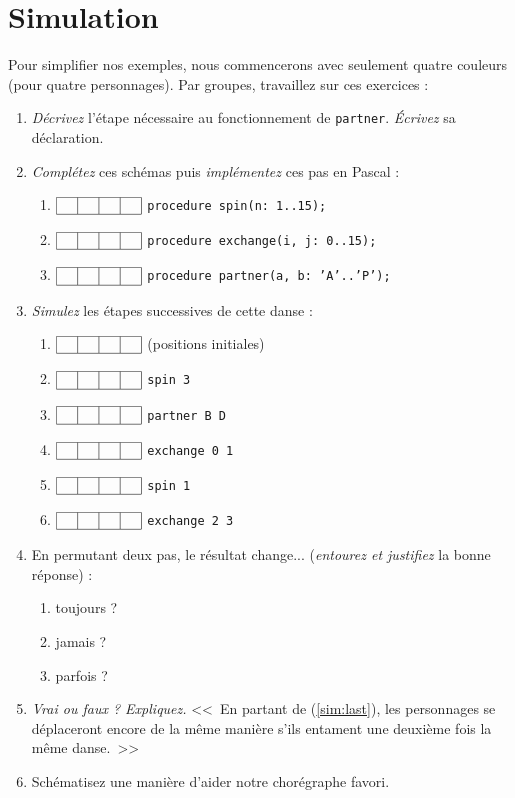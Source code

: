 \documentclass[11pt,a4paper,oneside]{book}
\begin{document}
\chapter{Simulation}\label{ch:sim}
Pour simplifier nos exemples, nous commencerons avec seulement quatre couleurs
(pour quatre personnages).
\newcommand{\boxes}{
	$\begin{array}{|l|l|l|l|}\hline
	\phantom{a} & \phantom{a} & \phantom{a} & \phantom{a} \\ \hline
	\end{array}$
}
Par groupes, travaillez sur ces exercices :
\begin{enumerate}
\item \emph{Décrivez} l'étape nécessaire au fonctionnement de \texttt{partner}.
	\emph{Écrivez} sa déclaration.
\item \emph{Complétez} ces schémas puis \emph{implémentez} ces pas en Pascal :
	\begin{enumerate}
	\item \boxes \texttt{procedure spin(n: 1..15);}
	\item \boxes \texttt{procedure exchange(i, j: 0..15);}
	\item \boxes \texttt{procedure partner(a, b: 'A'..'P');}
	\end{enumerate}
\item \emph{Simulez} les étapes successives de cette danse :
	\begin{enumerate}
	\item \boxes (positions initiales)
	\item \boxes \texttt{spin 3}
	\item \boxes \texttt{partner B D}
	\item \boxes \texttt{exchange 0 1}
	\item \boxes \texttt{spin 1}
	\item \boxes \texttt{exchange 2 3} \label{sim:last}
	\end{enumerate}
\item En permutant deux pas, le résultat change...
	(\emph{entourez et justifiez} la bonne réponse) :
	\begin{enumerate}
		\item toujours ? 
		\item jamais ? 
		\item parfois ?
	\end{enumerate}
\item \emph{Vrai ou faux ? Expliquez. }
	<<~En partant de (\ref{sim:last}), les personnages se déplaceront encore de
	la même manière s'ils entament une deuxième fois la même danse.~>>
\item Schématisez une manière d'aider notre chorégraphe favori.
\end{enumerate}
\end{document}
